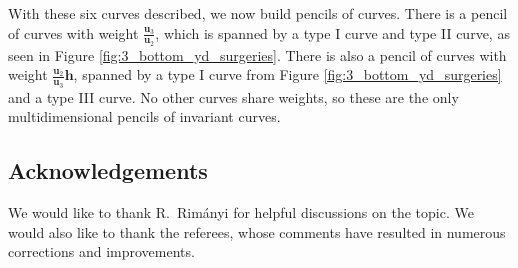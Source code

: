 \documentclass[pdftex]{sigma}
\numberwithin{equation}{section}
\newcommand{\hb}{\mathbf h}
\newcommand{\ub}{\mathbf u}
\begin{document}
With these six curves described, we now build pencils of curves. There is a pencil of curves with weight $\frac{\ub_3}{\ub_2}$, which is spanned by a type I curve and type II curve, as seen in Figure \ref{fig:3_bottom_yd_surgeries}. There is also a pencil of curves with weight $\frac{\ub_2}{\ub_3}\hb$, spanned by a type I curve from Figure \ref{fig:3_bottom_yd_surgeries} and a type III curve. No other curves share weights, so these are the only multidimensional pencils of invariant curves.



\subsection*{Acknowledgements}

We would like to thank R.~Rim\'anyi for helpful discussions on the topic.
We would also like to thank the referees, whose comments have resulted in numerous corrections and improvements.
\end{document}
